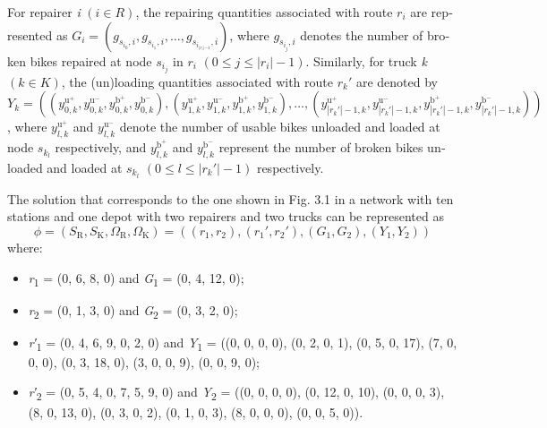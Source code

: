 \documentclass[
  english,
]{article}
\begin{document}
\begin{otherlanguage}{english}
\protect{}\label{p0275}
For repairer \emph{i} \(\left( {i \in R} \right)\), the repairing quantities associated with route
\(r_{i}\) are represented as
\(G_{i} = \left( {g_{s_{i_{0}},i},g_{s_{i_{1}},i},\ldots,g_{s_{i_{|r_{i}{| - 1}}},i}} \right)\),
where \(g_{s_{i_{j}},i}\) denotes the number of broken bikes repaired at node \(s_{i_{j}}\) in
\(r_{i}\) \(\left( {0 \leq j \leq \left| r_{i} \right| - 1} \right)\). Similarly, for truck \emph{k}
\(\left( {k \in K} \right)\), the (un)loading quantities associated with route \(r_{k}'\) are
denoted by
\(Y_{k} = \left( {\left( {y_{0,k}^{\text{u}^{+}},y_{0,k}^{\text{u}^{-}},y_{0,k}^{\text{b}^{+}},y_{0,k}^{\text{b}^{-}}} \right),\left( {y_{1,k}^{\text{u}^{+}},y_{1,k}^{\text{u}^{-}},y_{1,k}^{\text{b}^{+}},y_{1,k}^{\text{b}^{-}}} \right),\ldots,\left( {y_{{|r_{k}'|} - 1,k}^{\text{u}^{+}},y_{{|r_{k}'|} - 1,k}^{\text{u}^{-}},y_{{|r_{k}'|} - 1,k}^{\text{b}^{+}},y_{{|r_{k}'|} - 1,k}^{\text{b}^{-}}} \right)} \right)\),
where \(y_{l,k}^{\text{u}^{+}}\) and \(y_{l,k}^{\text{u}^{-}}\) denote the number of usable bikes
unloaded and loaded at node \(s_{k_{l}}\) respectively, and \(y_{l,k}^{\text{b}^{+}}\) and
\(y_{l,k}^{\text{b}^{-}}\) represent the number of broken bikes unloaded and loaded at \(s_{k_{l}}\)
\(\left( {0 \leq l \leq \left| r_{k}' \right| - 1} \right)\) respectively.

\protect{}\label{p0280}
The solution that corresponds to the one shown in Fig. 3.1 in a network with ten stations and one
depot with two repairers and two trucks can be represented
as\[\phi = \left( {S_{\text{R}},S_{\text{K}},\Omega_{\text{R}},\Omega_{\text{K}}} \right) = \left( {\left( {r_{1},r_{2}} \right),\left( {r_{1}',r_{2}'} \right),\left( {G_{1},G_{2}} \right),\left( {Y_{1},Y_{2}} \right)} \right)\]where:

\begin{itemize}
\item
  \protect{}\label{p0285}
  \emph{r}\textsubscript{1} = (0, 6, 8, 0) and \emph{G}\textsubscript{1} = (0, 4, 12, 0);
\item
  \protect{}\label{p0290}
  \emph{r}\textsubscript{2} = (0, 1, 3, 0) and \emph{G}\textsubscript{2} = (0, 3, 2, 0);
\item
  \protect{}\label{p0295}
  \emph{r′}\textsubscript{1} = (0, 4, 6, 9, 0, 2, 0) and \emph{Y}\textsubscript{1} = ((0, 0, 0, 0),
  (0, 2, 0, 1), (0, 5, 0, 17), (7, 0, 0, 0), (0, 3, 18, 0), (3, 0, 0, 9), (0, 0, 9, 0);
\item
  \protect{}\label{p0300}
  \emph{r′}\textsubscript{2} = (0, 5, 4, 0, 7, 5, 9, 0) and \emph{Y}\textsubscript{2} = ((0, 0, 0,
  0), (0, 12, 0, 10), (0, 0, 0, 3), (8, 0, 13, 0), (0, 3, 0, 2), (0, 1, 0, 3), (8, 0, 0, 0), (0, 0,
  5, 0)).
\end{itemize}


\end{otherlanguage}
\end{document}
